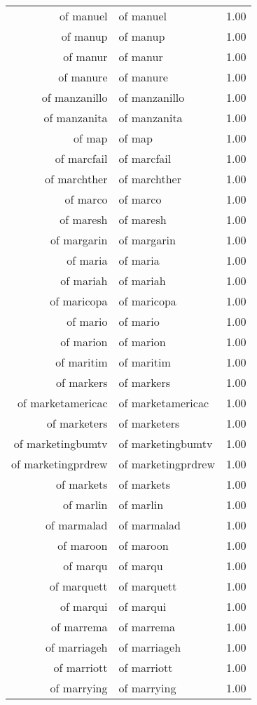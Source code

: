 \begin{table}[ht]
\begin{tabular}{rlr}
  of manuel & of manuel & 1.00 \\ 
  of manup & of manup & 1.00 \\ 
  of manur & of manur & 1.00 \\ 
  of manure & of manure & 1.00 \\ 
  of manzanillo & of manzanillo & 1.00 \\ 
  of manzanita & of manzanita & 1.00 \\ 
  of map & of map & 1.00 \\ 
  of marcfail & of marcfail & 1.00 \\ 
  of marchther & of marchther & 1.00 \\ 
  of marco & of marco & 1.00 \\ 
  of maresh & of maresh & 1.00 \\ 
  of margarin & of margarin & 1.00 \\ 
  of maria & of maria & 1.00 \\ 
  of mariah & of mariah & 1.00 \\ 
  of maricopa & of maricopa & 1.00 \\ 
  of mario & of mario & 1.00 \\ 
  of marion & of marion & 1.00 \\ 
  of maritim & of maritim & 1.00 \\ 
  of markers & of markers & 1.00 \\ 
  of marketamericac & of marketamericac & 1.00 \\ 
  of marketers & of marketers & 1.00 \\ 
  of marketingbumtv & of marketingbumtv & 1.00 \\ 
  of marketingprdrew & of marketingprdrew & 1.00 \\ 
  of markets & of markets & 1.00 \\ 
  of marlin & of marlin & 1.00 \\ 
  of marmalad & of marmalad & 1.00 \\ 
  of maroon & of maroon & 1.00 \\ 
  of marqu & of marqu & 1.00 \\ 
  of marquett & of marquett & 1.00 \\ 
  of marqui & of marqui & 1.00 \\ 
  of marrema & of marrema & 1.00 \\ 
  of marriageh & of marriageh & 1.00 \\ 
  of marriott & of marriott & 1.00 \\ 
  of marrying & of marrying & 1.00 \\ 

\end{tabular}
\end{table}
